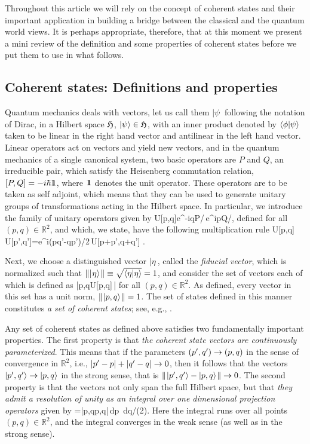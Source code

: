 Throughout this article we will rely on the concept of coherent states and 
their important application in building a bridge between the classical and 
the quantum world views. It is perhaps appropriate, therefore, that at this 
moment we present a mini review of the definition and some properties of 
coherent states before we put them to use in what follows.

\subsection{Coherent states: Definitions and properties}
Quantum mechanics deals with vectors, let us call them $|\psi\>$ following 
the notation of Dirac, in a Hilbert space $\frak H$, $|\psi\>\in{\frak H}$, 
with an inner product denoted by $\<\phi|\psi\>$ taken to be linear in the 
right hand vector and antilinear in the left hand vector. Linear operators 
act on vectors and yield new vectors, and in the quantum mechanics of a 
single canonical system, two basic operators are $P$ and $Q$, an 
irreducible pair,  which satisfy the Heisenberg commutation relation, 
$[P,Q]=-i\hbar\one$, where $\one$ denotes the unit operator. These 
operators are to be taken as self adjoint, which means that they can be 
used to generate unitary groups of transformations acting in the Hilbert 
space. In particular, we introduce the family of unitary operators given by
   \bn  U[p,q]\equiv e^{-iqP/\hbar}\,e^{ipQ/\hbar}\;,  \en
defined for all $(p,q)\in{\mathbb R}^2$, and which, we state, have the 
following multiplication rule
   \bn  U[p,q]\,U[p',q']=e^{i\s(pq'-qp')/2\hbar}\,U[p+p',q+q'] \;. \en

Next, we choose a distinguished vector $|\eta\>$, called the {\it fiducial 
vector}, 
which is normalized such that $\||\s\eta\>\s\|\equiv\sqrt{\<\eta|\eta\>}=1$, 
and consider the set of vectors each of which is defined as
  \bn  |p,q\>\equiv U[p,q]\,|\eta\>  \en
for all $(p,q)\in{\mathbb R}^2$. As defined, every vector in this set has 
a unit norm, $\|\s|p,q\>\s\|=1$. The set of states defined in this manner 
constitutes {\it a set of coherent states}; see, e.g., \cite{klabs}. 

Any set of coherent states as defined above satisfies two fundamentally 
important properties. The first property is that {\it the coherent state 
vectors are continuously parameterized}. This means that if the parameters 
$(p',q')\ra(p,q)$ in the sense of convergence in ${\mathbb R}^2$, i.e., 
$|p'-p|+|q'-q|\ra0$, then it follows that the vectors $|p',q'\>\ra|p,q\>$ 
in the strong sense, that is $\|\s|p',q'\>-|p,q\>\s\|\ra0$. The second 
property is that the vectors not only span the full Hilbert space, but 
that {\it they admit a resolution of unity as an integral over one 
dimensional projection operators} given by
  \bn  \one=\int|p,q\>\<p,q|\,dp\, dq/(2\pi\hbar)\;. \en
Here the integral runs over all points $(p,q)\in{\mathbb R}^2$, and the 
integral converges in the weak sense (as well as in the strong sense).

